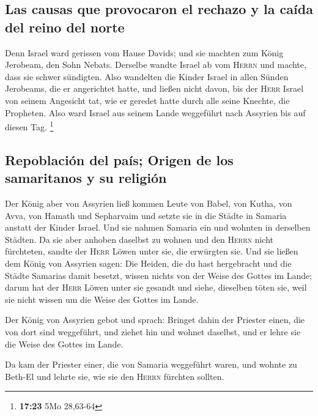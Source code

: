 \hypertarget{las-causas-que-provocaron-el-rechazo-y-la-cauxedda-del-reino-del-norte}{%
\subsection{Las causas que provocaron el rechazo y la caída del reino
del
norte}\label{las-causas-que-provocaron-el-rechazo-y-la-cauxedda-del-reino-del-norte}}

 Denn Israel ward gerissen vom Hause Davids; und sie
machten zum König Jerobeam, den Sohn Nebats. Derselbe wandte Israel ab
vom \textsc{Herrn} und machte, dass sie schwer sündigten.
 Also wandelten die Kinder Israel in allen Sünden
Jerobeams, die er angerichtet hatte, und ließen nicht davon,
 bis der \textsc{Herr} Israel von seinem Angesicht tat,
wie er geredet hatte durch alle seine Knechte, die Propheten. Also ward
Israel aus seinem Lande weggeführt nach Assyrien bis auf diesen Tag.
\footnote{\textbf{17:23} 5Mo 28,63-64}

\hypertarget{repoblaciuxf3n-del-pauxeds-origen-de-los-samaritanos-y-su-religiuxf3n}{%
\subsection{Repoblación del país; Origen de los samaritanos y su
religión}\label{repoblaciuxf3n-del-pauxeds-origen-de-los-samaritanos-y-su-religiuxf3n}}

 Der König aber von Assyrien ließ kommen Leute von Babel,
von Kutha, von Avva, von Hamath und Sepharvaim und setzte sie in die
Städte in Samaria anstatt der Kinder Israel. Und sie nahmen Samaria ein
und wohnten in derselben Städten.  Da sie aber anhoben
daselbst zu wohnen und den \textsc{Herrn} nicht fürchteten, sandte der
\textsc{Herr} Löwen unter sie, die erwürgten sie.  Und
sie ließen dem König von Assyrien sagen: Die Heiden, die du hast
hergebracht und die Städte Samarias damit besetzt, wissen nichts von der
Weise des Gottes im Lande; darum hat der \textsc{Herr} Löwen unter sie
gesandt und siehe, dieselben töten sie, weil sie nicht wissen um die
Weise des Gottes im Lande.

 Der König von Assyrien gebot und sprach: Bringet dahin
der Priester einen, die von dort sind weggeführt, und ziehet hin und
wohnet daselbst, und er lehre sie die Weise des Gottes im Lande.

 Da kam der Priester einer, die von Samaria weggeführt
waren, und wohnte zu Beth-El und lehrte sie, wie sie den \textsc{Herrn}
fürchten sollten.

